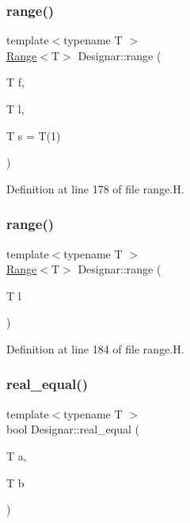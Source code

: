 \subsubsection{\texorpdfstring{range()}{range()}\hspace{0.1cm}{\footnotesize\ttfamily [1/2]}}
{\footnotesize\ttfamily template$<$typename T $>$ \\
\hyperlink{class_designar_1_1_range}{Range}$<$T$>$ Designar\+::range (\begin{DoxyParamCaption}\item[{T}]{f,  }\item[{T}]{l,  }\item[{T}]{s = {\ttfamily T(1)} }\end{DoxyParamCaption})}



Definition at line 178 of file range.\+H.

\mbox{\label{namespace_designar_a98dd2d05fccceaa32cdbf3f34c7dc120}} 
\subsubsection{\texorpdfstring{range()}{range()}\hspace{0.1cm}{\footnotesize\ttfamily [2/2]}}
{\footnotesize\ttfamily template$<$typename T $>$ \\
\hyperlink{class_designar_1_1_range}{Range}$<$T$>$ Designar\+::range (\begin{DoxyParamCaption}\item[{T}]{l }\end{DoxyParamCaption})}



Definition at line 184 of file range.\+H.

\mbox{\label{namespace_designar_aa3e1023369fdb239670900996db45d05}} 
\subsubsection{\texorpdfstring{real\+\_\+equal()}{real\_equal()}}
{\footnotesize\ttfamily template$<$typename T $>$ \\
bool Designar\+::real\+\_\+equal (\begin{DoxyParamCaption}\item[{T}]{a,  }\item[{T}]{b }\end{DoxyParamCaption})}



